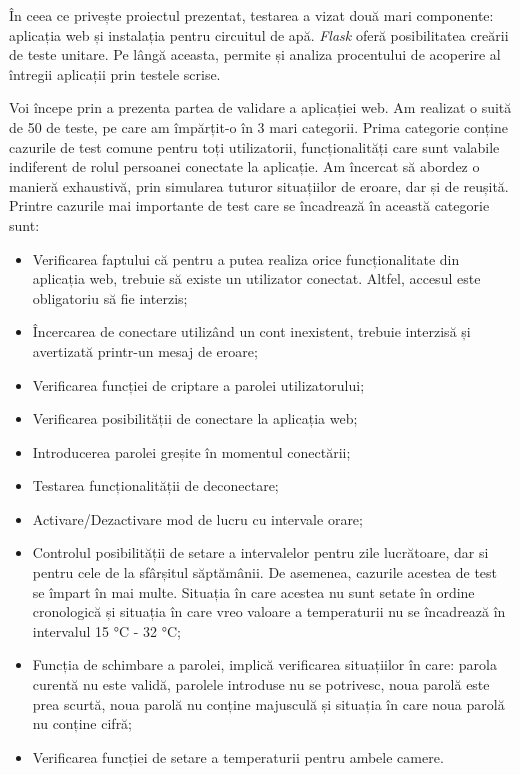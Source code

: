 	În ceea ce privește proiectul prezentat, testarea a vizat două mari componente: aplicația web și instalația pentru circuitul de apă. \textit{Flask} oferă posibilitatea creării de teste unitare. Pe lângă aceasta, permite și analiza procentului de acoperire al întregii aplicații prin testele scrise.

	Voi începe prin a prezenta partea de validare a aplicației web. Am realizat o suită de 50 de teste, pe care am împărțit-o în 3 mari categorii. Prima categorie conține cazurile de test comune pentru toți utilizatorii, funcționalități care sunt valabile indiferent de rolul persoanei conectate la aplicație. Am încercat să abordez o manieră exhaustivă, prin simularea tuturor situațiilor de eroare, dar și de reușită. Printre cazurile mai importante de test care se încadrează în această categorie sunt:

	\begin{itemize}
			\setlength{\itemindent}{2em}
			\itemsep0em
			\item Verificarea faptului că pentru a putea realiza orice funcționalitate din aplicația web, trebuie să existe un utilizator conectat. Altfel, accesul este obligatoriu să fie interzis;
			\item Încercarea de conectare utilizând un cont inexistent, trebuie interzisă și avertizată printr-un mesaj de eroare;
			\item Verificarea funcției de criptare a parolei utilizatorului;
			\item Verificarea posibilității de conectare la aplicația web;
			\item Introducerea parolei greșite în momentul conectării;
			\item Testarea funcționalității de deconectare;
			\item Activare/Dezactivare mod de lucru cu intervale orare;
			\item Controlul posibilității de setare a intervalelor pentru zile lucrătoare, dar si pentru cele de la sfârșitul săptămânii. De asemenea, cazurile acestea de test se împart în mai multe. Situația în care acestea nu sunt setate în ordine cronologică și situația în care vreo valoare a temperaturii nu se încadrează în intervalul 15 °C - 32 °C;
			\item Funcția de schimbare a parolei, implică verificarea situațiilor în care: parola curentă nu este validă, parolele introduse nu se potrivesc, noua parolă este prea scurtă, noua parolă nu conține majusculă și situația în care noua parolă nu conține cifră;
			\item Verificarea funcției de setare a temperaturii pentru ambele camere.
	\end{itemize} 

